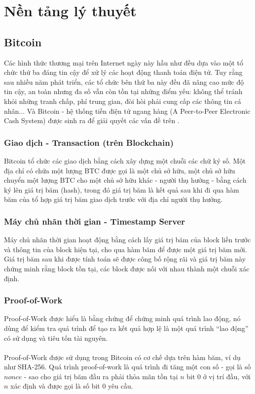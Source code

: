 \chapter{Nền tảng lý thuyết}
\section{Bitcoin}
Các hình thức thương mại trên Internet ngày này hầu như đều dựa vào một tổ chức 
thứ ba đáng tin cậy để xử lý các hoạt động thanh toán điện tử. Tuy rằng sau nhiều 
năm phát triển, các tổ chức bên thứ ba này đều đã nâng cao mức độ tin cậy, an 
toàn nhưng đa số vẫn còn tồn tại những điểm yếu: không thể tránh khỏi những tranh 
chấp, phí trung gian, đòi hòi phải cung cấp các thông tin cá nhân... Và Bitcoin - 
hệ thống tiền điện tử ngang hàng (A Peer-to-Peer Electronic Cash System) được 
sinh ra để giải quyết các vấn đề trên \cite{BitcoinPaper}.
\subsection{Giao dịch - Transaction (trên Blockchain)}
Bitcoin tổ chức các giao dịch bằng cách xây dựng một chuỗi các chữ ký số. Một 
địa chỉ có chứa một lượng BTC được gọi là một chủ sở hữu, một chủ sở hữu 
chuyển một lượng BTC cho một chủ sở hữu khác - người thụ hưởng - bằng cách ký 
lên giá trị băm (hash), trong đó giá trị băm là kết quả sau khi đi qua hàm băm
của tổ hợp giá trị băm giao dịch trước với địa chỉ người thụ hưởng.
\subsection{Máy chủ nhãn thời gian - Timestamp Server}
Máy chủ nhãn thời gian hoạt động bằng cách lấy giá trị băm của block liền trước 
và thông tin của block hiện tại, cho qua hàm băm để được một giá trị băm mới. 
Giá trị băm sau khi được tính toán sẽ được công bố rộng rãi và giá trị băm này 
chứng minh rằng block tồn tại, các block được nối với nhau thành một chuỗi xác 
định.
\subsection{Proof-of-Work}
Proof-of-Work được hiểu là bằng chứng để chứng minh quá trình lao động, nó dùng 
để kiểm tra quá trình để tạo ra kết quả hợp lệ là một quá trình ``lao động'' có 
sử dụng và tiêu tốn tài nguyên.\\\\
Proof-of-Work được sử dụng trong Bitcoin có cơ chế dựa trên hàm băm, ví dụ như 
SHA-256. Quá trình proof-of-work là quá trình đi tăng một con số - gọi là số 
$nonce$ - sao cho giá trị băm đầu ra phải thỏa mãn tồn tại $n$ bit 0 ở vị trí 
đầu, với $n$ xác định và được gọi là số bit 0 yêu cầu.
